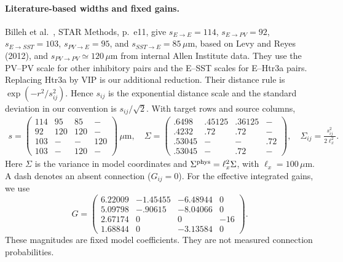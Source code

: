 \documentclass[11pt]{article}
\newcommand{\ee}{\mathrm{e}}
\begin{document}
\paragraph{Literature-based widths and fixed gains.}
Billeh et al.~\cite{billeh2020}, STAR Methods, p.~e11, give
$s_{E\to E}=114$, $s_{E\to PV}=92$, $s_{E\to SST}=103$,
$s_{PV\to E}=95$, and $s_{SST\to E}=85\,\mu\mathrm m$, based on
Levy and Reyes (2012), and $s_{PV\to PV}\simeq120\,\mu\mathrm m$
from internal Allen Institute data. They use the PV--PV scale for other
inhibitory pairs and the E--SST scales for E--Htr3a pairs.
Replacing Htr3a by VIP is our additional reduction.
Their distance rule is $\exp(-r^2/s_{ij}^2)$. Hence $s_{ij}$ is the
exponential distance scale and the standard deviation in our convention
is $s_{ij}/\sqrt2$. With target rows and source columns,
\begin{equation}
 \begin{aligned}
 s=\begin{pmatrix}
 114&95&85&-\\92&120&120&-\\103&-&-&120\\103&-&120&-
 \end{pmatrix}\,\mu\mathrm m, \quad 
 \Sigma=\begin{pmatrix}
 .6498&.45125&.36125&-\\.4232&.72&.72&-\\
 .53045&-&-&.72\\.53045&-&.72&-
 \end{pmatrix},\quad
 \Sigma_{ij}=\frac{s_{ij}^2}{2\ell_x^2}.
 \end{aligned}
 \label{eq:v1-width-matrices}
\end{equation}
Here $\Sigma$ is the variance in model coordinates and
$\Sigma^{\rm phys}=\ell_x^2\Sigma$, with $\ell_x=100\,\mu\mathrm m$.
A dash denotes an absent connection ($G_{ij}=0$).
For the effective integrated gains, we use
\begin{equation}
 G=\begin{pmatrix}
 6.22009&-1.45455&-6.48944&0\\
 5.09798&-.90615&-8.04066&0\\
 2.67174&0&0&-16\\
 1.68844&0&-3.13584&0
 \end{pmatrix}.
 \label{eq:v1-gain-matrices}
\end{equation}
These magnitudes are fixed model coefficients. They are not measured
connection probabilities. 
\end{document}
